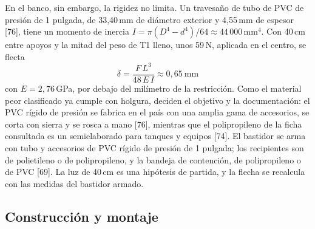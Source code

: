 
En el banco, sin embargo, la rigidez no limita. Un travesaño de tubo de PVC de presión de 1 pulgada, de 33,40\,mm de diámetro exterior y 4,55\,mm de espesor [76], tiene un momento de inercia $I=\pi(D^4-d^4)/64\approx44\,000$\,mm$^4$. Con 40\,cm entre apoyos y la mitad del peso de T1 lleno, unos 59\,N, aplicada en el centro, se flecta
\begin{equation}
\delta=\frac{F\,L^3}{48\,E\,I}\approx0{,}65\ \text{mm}\label{eq:flecha}
\end{equation}
con $E=2{,}76$\,GPa, por debajo del milímetro de la restricción. Como el material peor clasificado ya cumple con holgura, deciden el objetivo y la documentación: el PVC rígido de presión se fabrica en el país con una amplia gama de accesorios, se corta con sierra y se rosca a mano [76], mientras que el polipropileno de la ficha consultada es un semielaborado para tanques y equipos [74]. El bastidor se arma con tubo y accesorios de PVC rígido de presión de 1 pulgada; los recipientes son de polietileno o de polipropileno, y la bandeja de contención, de polipropileno o de PVC [69]. La luz de 40\,cm es una hipótesis de partida, y la flecha se recalcula con las medidas del bastidor armado.

\subsection{Construcción y montaje}\label{sec:mont}


